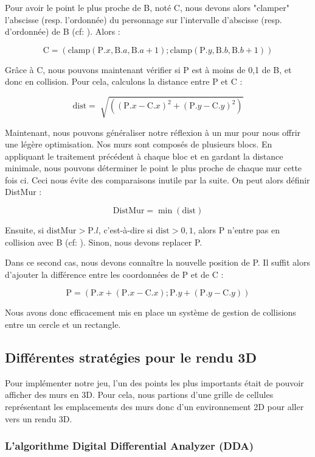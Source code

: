 \documentclass[11pt]{article}
\begin{document}
Pour avoir le point le plus proche de B, noté C, nous devons alors "clamper" 
l'abscisse (resp. l'ordonnée) du personnage sur l'intervalle d'abscisse 
(resp. d'ordonnée) de B (cf: ). Alors :

$$\text{C} = (\text{clamp}(\text{P}.x, \text{B}.a, \text{B}.a +1) ; \text{clamp}(\text{P}.y, \text{B}.b, \text{B}.b +1))$$

Grâce à C, nous pouvons maintenant vérifier si P est à moins de 0,1 de B, 
et donc en collision. Pour cela, calculons la distance entre P et C :

$$\text{dist} = \sqrt[]{((\text{P}.x - \text{C}.x)^2 + (\text{P}.y - \text{C}.y)^2)}$$

Maintenant, nous pouvons généraliser notre réflexion à un mur pour nous 
offrir une légère optimisation. Nos murs sont composés de plusieurs blocs. 
En appliquant le traitement précédent à chaque bloc et en gardant la 
distance minimale, nous pouvons déterminer le point le plus proche de 
chaque mur cette fois ci. Ceci nous évite des comparaisons inutile par la 
suite. On peut alors définir DistMur :

$$\text{DistMur} = \min(\text{dist})$$

Ensuite, si $\text{distMur} > \text{P}.l$, c'est-à-dire si $\text{dist} > 0,1$, alors P n'entre pas en collision avec B (cf: ). Sinon, nous devons replacer P.

Dans ce second cas, nous devons connaître la nouvelle position de P. Il 
suffit alors d'ajouter la différence entre les coordonnées de P et de C :

$$\text{P} = (\text{P}.x + (\text{P}.x - \text{C}.x) ; \text{P}.y + (\text{P}.y - \text{C}.y))$$

Nous avons donc efficacement mis en place un système de gestion de 
collisions entre un cercle et un rectangle.

\subsection{Différentes stratégies pour le rendu 3D}
Pour implémenter notre jeu, l'un des points les plus importants était de pouvoir afficher des murs en 3D. Pour cela, nous partions d'une grille de cellules 
représentant les emplacements des murs donc d'un environnement 2D pour aller vers un rendu 3D.

\subsubsection{L'algorithme Digital Differential Analyzer (DDA)}
\end{document}
